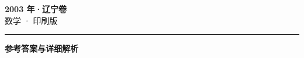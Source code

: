 \documentclass[zihao=5, a4paper]{ctexart}
\begin{document}
\begin{center}
  {\Large\bfseries 2003 年·辽宁卷}\\[4pt]
  {\large 数学 · 印刷版}
\end{center}
\medskip
{}

\par\bigskip\hrule\bigskip
{}
\begin{center}{\large\bfseries 参考答案与详细解析}\end{center}
\smallskip

\end{document}
